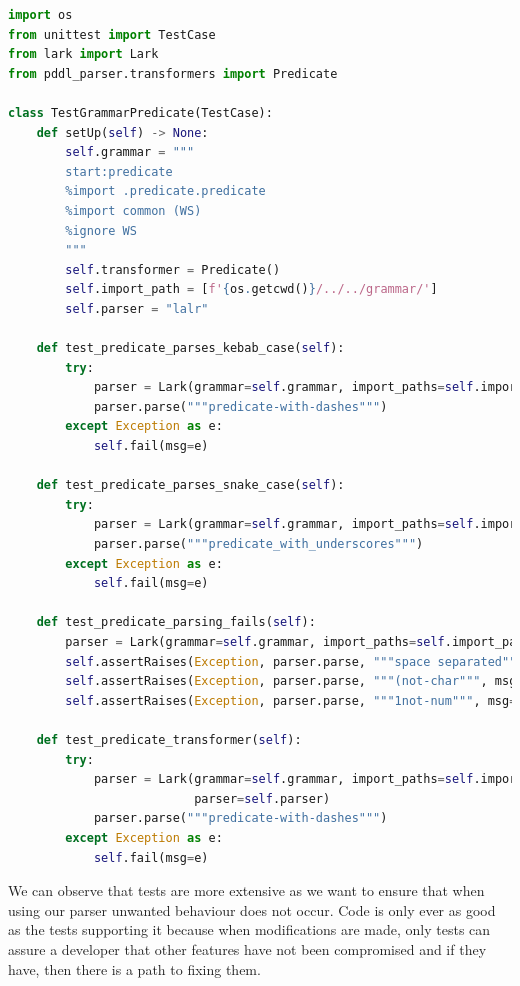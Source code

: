 \newpage
\begin{lstlisting}[language=Python]
import os
from unittest import TestCase
from lark import Lark
from pddl_parser.transformers import Predicate

class TestGrammarPredicate(TestCase):
    def setUp(self) -> None:
        self.grammar = """
        start:predicate
        %import .predicate.predicate
        %import common (WS)
        %ignore WS
        """
        self.transformer = Predicate()
        self.import_path = [f'{os.getcwd()}/../../grammar/']
        self.parser = "lalr"

    def test_predicate_parses_kebab_case(self):
        try:
            parser = Lark(grammar=self.grammar, import_paths=self.import_path, parser=self.parser)
            parser.parse("""predicate-with-dashes""")
        except Exception as e:
            self.fail(msg=e)

    def test_predicate_parses_snake_case(self):
        try:
            parser = Lark(grammar=self.grammar, import_paths=self.import_path, parser=self.parser)
            parser.parse("""predicate_with_underscores""")
        except Exception as e:
            self.fail(msg=e)

    def test_predicate_parsing_fails(self):
        parser = Lark(grammar=self.grammar, import_paths=self.import_path, parser=self.parser)
        self.assertRaises(Exception, parser.parse, """space separated""", msg='failed to raise on space separator')
        self.assertRaises(Exception, parser.parse, """(not-char""", msg='failed to raise on non char in word')
        self.assertRaises(Exception, parser.parse, """1not-num""", msg='failed to raise on num in word')

    def test_predicate_transformer(self):
        try:
            parser = Lark(grammar=self.grammar, import_paths=self.import_path, transformer=self.transformer,
                          parser=self.parser)
            parser.parse("""predicate-with-dashes""")
        except Exception as e:
            self.fail(msg=e)
\end{lstlisting}
We can observe that tests are more extensive as we want to ensure that when using our parser unwanted behaviour does not occur. Code is only ever as good as the tests supporting it because when modifications are made, only tests can assure a developer that other features have not been compromised and if they have, then there is a path to fixing them.
\newpage
